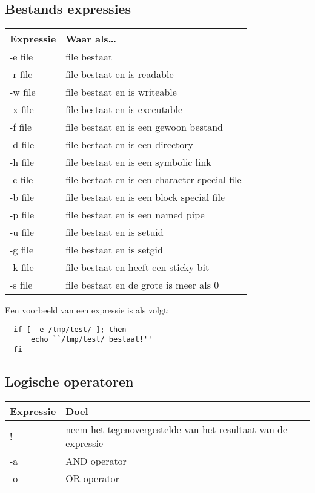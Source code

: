 \subsection{Bestands expressies}\label{h7.bestandexp}
\begin{tabular}[t]{ll}
  Expressie & Waar als\ldots\\
  \hline
  -e file & file bestaat \\
  -r file & file bestaat en is readable \\
  -w file & file bestaat en is writeable \\
  -x file & file bestaat en is executable \\
  -f file & file bestaat en is een gewoon bestand \\
  -d file & file bestaat en is een directory \\
  -h file & file bestaat en is een symbolic link \\
  -c file & file bestaat en is een character special file \\
  -b file & file bestaat en is een block special file \\
  -p file & file bestaat en is een named pipe \\
  -u file & file bestaat en is setuid \\
  -g file & file bestaat en is setgid \\
  -k file & file bestaat en heeft een sticky bit \\
  -s file & file bestaat en de grote is meer als 0 \\
\end{tabular}

Een voorbeeld van een expressie is als volgt:
\begin{lstlisting}
  if [ -e /tmp/test/ ]; then
      echo ``/tmp/test/ bestaat!''
  fi
\end{lstlisting}

\subsection{Logische operatoren}
\begin{tabular}[t]{ll}
  Expressie & Doel
  \\
  \hline
  ! & neem het tegenovergestelde van het resultaat van de expressie \\
  -a & AND operator \\ 
  -o & OR operator \\
 \end{tabular}

